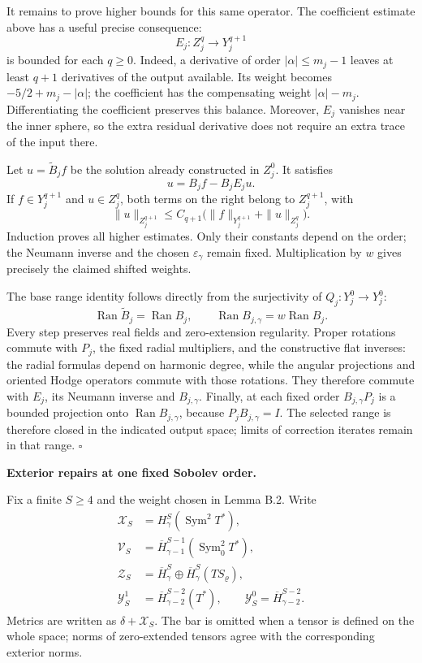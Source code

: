 \documentclass[
  english,
  11pt,
  reqno]{amsart}
\begin{document}
It remains to prove higher bounds for this same operator. The
coefficient estimate above has a useful precise consequence: \[
E_j:Z_j^q\longrightarrow Y_j^{q+1}
\] is bounded for each \(q\ge0\). Indeed, a derivative of order
\(|\alpha|\le m_j-1\) leaves at least \(q+1\) derivatives of the output
available. Its weight becomes \(-5/2+m_j-|\alpha|\); the coefficient has
the compensating weight \(|\alpha|-m_j\). Differentiating the
coefficient preserves this balance. Moreover, \(E_j\) vanishes near the
inner sphere, so the extra residual derivative does not require an extra
trace of the input there.

Let \(u=\widetilde B_j f\) be the solution already constructed in
\(Z_j^0\). It satisfies \[
u=B_jf-B_jE_ju.
\] If \(f\in Y_j^{q+1}\) and \(u\in Z_j^q\), both terms on the right
belong to \(Z_j^{q+1}\), with \[
\|u\|_{Z_j^{q+1}}
\le C_{q+1}\bigl(
\|f\|_{Y_j^{q+1}}+\|u\|_{Z_j^q}\bigr).
\] Induction proves all higher estimates. Only their constants depend on
the order; the Neumann inverse and the chosen \(\varepsilon_\gamma\)
remain fixed. Multiplication by \(w\) gives precisely the claimed
shifted weights.

The base range identity follows directly from the surjectivity of
\(Q_j:Y_j^0\to Y_j^0\): \[
\operatorname{Ran}\widetilde B_j=\operatorname{Ran}B_j,
\qquad
\operatorname{Ran}B_{j,\gamma}
=w\operatorname{Ran}B_j.
\] Every step preserves real fields and zero-extension regularity.
Proper rotations commute with \(P_j\), the fixed radial multipliers, and
the constructive flat inverses: the radial formulas depend on harmonic
degree, while the angular projections and oriented Hodge operators
commute with those rotations. They therefore commute with \(E_j\), its
Neumann inverse and \(B_{j,\gamma}\). Finally, at each fixed order
\(B_{j,\gamma}P_j\) is a bounded projection onto
\(\operatorname{Ran}B_{j,\gamma}\), because \(P_jB_{j,\gamma}=I\). The
selected range is therefore closed in the indicated output space; limits
of correction iterates remain in that range. \hfill\(\square\)

\textbf{Exterior repairs at one fixed Sobolev order.}

Fix a finite \(S\ge4\) and the weight chosen in Lemma B.2. Write \[
\begin{aligned}
\mathcal X_S&=H^S_\gamma(\operatorname{Sym}^2T^*),\\
\mathcal V_S&=\overline H^{S-1}_{\gamma-1}
(\operatorname{Sym}^2_0T^*),\\
\mathcal Z_S&=\overline H^S_\gamma
\oplus\overline H^S_\gamma(TS_\varrho),\\
\mathcal Y_S^1&=\overline H^{S-2}_{\gamma-2}(T^*),\qquad
\mathcal Y_S^0=\overline H^{S-2}_{\gamma-2}.
\end{aligned}
\] Metrics are written as \(\delta+\mathcal X_S\). The bar is omitted
when a tensor is defined on the whole space; norms of zero-extended
tensors agree with the corresponding exterior norms.
\end{document}
